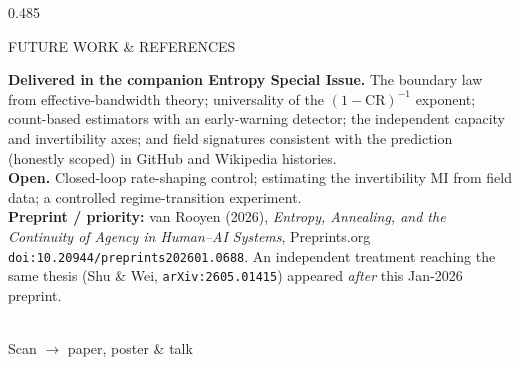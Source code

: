 \documentclass[final]{beamer}
\newlength{\colh}\setlength{\colh}{74cm}   %
\begin{document}
\begin{frame}[t]{}
\begin{columns}[t,totalwidth=\textwidth]
\begin{column}{0.485\textwidth}
\begin{minipage}[t][\colh][t]{\linewidth}
\begin{rblock}{FUTURE WORK \& REFERENCES}
\begin{minipage}[c]{0.7\linewidth}
\normalsize
\textbf{Delivered in the companion Entropy Special Issue.} The boundary law from effective-bandwidth theory; universality of the $(1-\mathrm{CR})^{-1}$ exponent; count-based estimators with an early-warning detector; the independent capacity and invertibility axes; and field signatures consistent with the prediction (honestly scoped) in GitHub and Wikipedia histories.\\[2mm]
\textbf{Open.} Closed-loop rate-shaping control; estimating the invertibility MI from field data; a controlled regime-transition experiment.\\[2mm]
\textbf{Preprint / priority:} van Rooyen (2026), \emph{Entropy, Annealing, and the Continuity of Agency in Human--AI Systems}, Preprints.org \texttt{doi:10.20944/preprints202601.0688}. An independent treatment reaching the same thesis (Shu \& Wei, \texttt{arXiv:2605.01415}) appeared \emph{after} this Jan-2026 preprint.
\end{minipage}\hfill
\begin{minipage}[c]{0.26\linewidth}
\centering
{}\\[2mm]
{\normalsize Scan $\rightarrow$ paper, poster \& talk}
\end{minipage}
\end{rblock}

\end{minipage}
\end{column}
\end{columns}
\end{frame}
\end{document}
